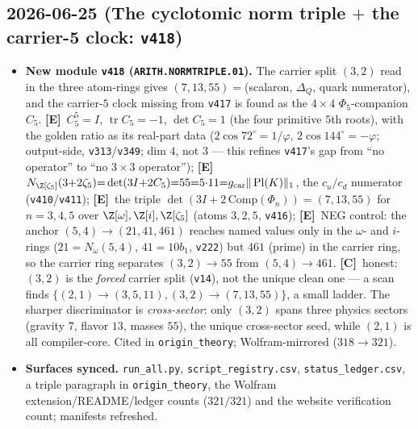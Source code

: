 \documentclass[11pt]{article}
\providecommand{\mE}{\textbf{[E]}}\providecommand{\mC}{\textbf{[C]}}
\providecommand{\vref}[1]{\texttt{#1}}
\providecommand{\gcar}{g_{\mathrm{car}}}\providecommand{\Nfam}{N_{\mathrm{fam}}}
\begin{document}
\subsection*{2026-06-25 (The cyclotomic norm triple $+$ the carrier-5 clock: \texttt{v418})}
\begin{itemize}
\item \textbf{New module \texttt{v418} (\texttt{ARITH.NORMTRIPLE.01}).} The carrier split $(3,2)$ read in
the three atom-rings gives $(7,13,55)=$(scalaron, $\Delta_Q$, quark numerator), and the carrier-$5$ clock
missing from \vref{v417} is found as the $4{\times}4$ $\Phi_5$-companion $C_5$. \mE\ $C_5^5{=}I$,
$\operatorname{tr}C_5{=}{-}1$, $\det C_5{=}1$ (the four primitive $5$th roots), with the golden ratio as its
real-part data ($2\cos72^\circ{=}1/\varphi$, $2\cos144^\circ{=}{-}\varphi$; output-side, \vref{v313}/\vref{v349};
dim $4$, not $3$ --- this refines \vref{v417}'s gap from ``no operator'' to ``no $3{\times}3$ operator''); \mE\
$N_{\Z[\zeta_5]}(3{+}2\zeta_5){=}\det(3I{+}2C_5){=}55{=}5{\cdot}11{=}\gcar\|\operatorname{Pl}(K)\|_1$, the
$c_u/c_d$ numerator (\vref{v410}/\vref{v411}); \mE\ the triple $\det(3I{+}2\,\mathrm{Comp}(\Phi_n))=(7,13,55)$
for $n{=}3,4,5$ over $\Z[\omega],\Z[i],\Z[\zeta_5]$ (atoms $3,2,5$, \vref{v416}); \mE\ NEG control: the anchor
$(5,4)\to(21,41,461)$ reaches named values only in the $\omega$- and $i$-rings ($21{=}N_\omega(5,4)$,
$41{=}10b_1$, \vref{v222}) but $461$ (prime) in the carrier ring, so the carrier ring separates
$(3,2)\to55$ from $(5,4)\to461$. \mC\ honest: $(3,2)$ is the \emph{forced} carrier split (\vref{v14}), not the
unique clean one --- a scan finds $\{(2,1)\to(3,5,11),(3,2)\to(7,13,55)\}$, a small ladder. The sharper discriminator is
\emph{cross-sector}: only $(3,2)$ spans three physics sectors (gravity $7$, flavor $13$, masses $55$),
the unique cross-sector seed, while $(2,1)$ is all compiler-core. Cited in
\texttt{origin\_theory}; Wolfram-mirrored ($318\to321$).
\item \textbf{Surfaces synced.} \texttt{run\_all.py}, \texttt{script\_registry.csv},
\texttt{status\_ledger.csv}, a triple paragraph in \texttt{origin\_theory}, the Wolfram
extension/README/ledger counts ($321/321$) and the website verification count; manifests refreshed.
\end{itemize}
\end{document}
